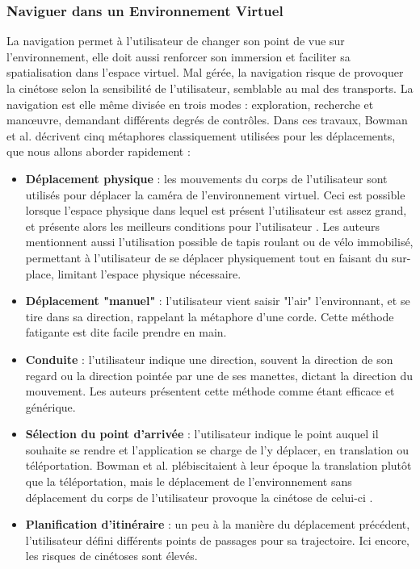 	\subsubsection{Naviguer dans un Environnement Virtuel}
		La navigation permet à l'utilisateur de changer son point de vue sur l'environnement, elle doit aussi renforcer son immersion et faciliter sa spatialisation dans l'espace virtuel. Mal gérée, la navigation risque de provoquer la cinétose selon la sensibilité de l'utilisateur, semblable au mal des transports. La navigation est elle même divisée en trois modes : exploration, recherche et manœuvre, demandant différents degrés de contrôles. Dans ces travaux, Bowman et al. décrivent cinq métaphores classiquement utilisées pour les déplacements, que nous allons aborder rapidement :
		\begin{itemize}
		\item \textbf{Déplacement physique} : les mouvements du corps de l'utilisateur sont utilisés pour déplacer la caméra de l'environnement virtuel. Ceci est possible lorsque l'espace physique dans lequel est présent l'utilisateur est assez grand, et présente alors les meilleurs conditions pour l'utilisateur \cite{cherep_spatial_2020}. Les auteurs mentionnent aussi l'utilisation possible de tapis roulant ou de vélo immobilisé, permettant à l'utilisateur de se déplacer physiquement tout en faisant du sur-place, limitant l'espace physique nécessaire.
		\item \textbf{Déplacement "manuel"} : l'utilisateur vient saisir "l'air" l'environnant, et se tire dans sa direction, rappelant la métaphore d'une corde. Cette méthode fatigante est dite facile prendre en main.
		\item \textbf{Conduite} : l'utilisateur indique une direction, souvent la direction de son regard ou la direction pointée par une de ses manettes, dictant la direction du mouvement. Les auteurs présentent cette méthode comme étant efficace et générique. 
		\item \textbf{Sélection du point d'arrivée} : l'utilisateur indique le point auquel il souhaite se rendre et l'application se charge de l'y déplacer, en translation ou téléportation. Bowman et al. plébiscitaient à leur époque la translation plutôt que la téléportation, mais le déplacement de l'environnement sans déplacement du corps de l'utilisateur provoque la cinétose de celui-ci \cite{cherep_spatial_2020}.
		\item \textbf{Planification d'itinéraire} : un peu à la manière du déplacement précédent, l'utilisateur défini différents points de passages pour sa trajectoire. Ici encore, les risques de cinétoses sont élevés.
		\end{itemize}
		
